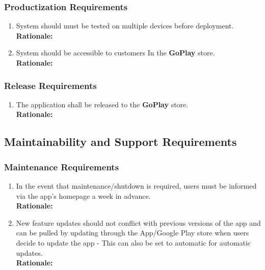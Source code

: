 \documentclass[]{article}
\begin{document}
\subsubsection{Productization Requirements}
\label{ssub:productization_requirements}
\begin{enumerate}[{OE-P}1. ]
	\item System should must be tested on multiple devices before deployment.\\
	{\bf Rationale:} 
	\item System should be accessible to customers In the \textbf{GoPlay} store.\\
	{\bf Rationale:} 
\end{enumerate}

\subsubsection{Release Requirements}
\label{ssub:release_requirements}
\begin{enumerate}[{OE-R}1. ]
	\item The application shall be released to the \textbf{GoPlay} store.\\
	{\bf Rationale:} 
\end{enumerate}


\subsection{Maintainability and Support Requirements}
\label{sub:maintainability_and_support_requirements}

\subsubsection{Maintenance Requirements}
\label{ssub:maintenance_requirements}
\begin{enumerate}[{MS-M}1. ]
	\item In the event that maintenance/shutdown is required, users must be informed via the app's homepage a week in advance.\\
	{\bf Rationale:} 
	\item New feature updates should not conflict with previous versions of the app and can be pulled by updating through the App/Google Play store when users decide to update the app - This can also be set to automatic for automatic updates.\\
	{\bf Rationale:} 
\end{enumerate}
\end{document}
